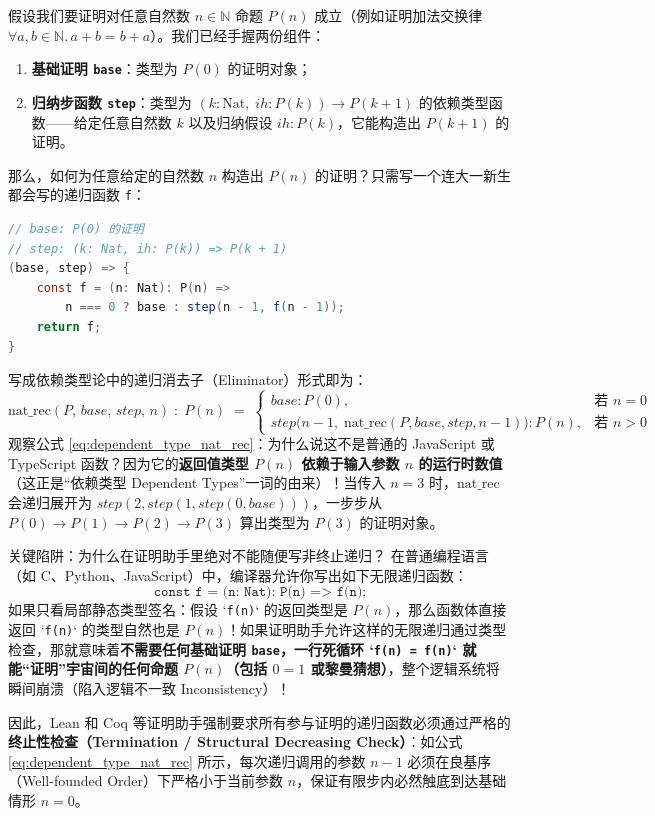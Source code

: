 \documentclass[a4paper]{article}
\begin{document}
假设我们要证明对任意自然数 $n \in \mathbb{N}$ 命题 $P(n)$ 成立（例如证明加法交换律 $\forall a, b \in \mathbb{N}.\, a + b = b + a$）。我们已经手握两份组件：
\begin{enumerate}
    \item \textbf{基础证明 \texttt{base}}：类型为 $P(0)$ 的证明对象；
    \item \textbf{归纳步函数 \texttt{step}}：类型为 $(k: \mathrm{Nat},\; \mathit{ih}: P(k)) \to P(k+1)$ 的依赖类型函数——给定任意自然数 $k$ 以及归纳假设 $\mathit{ih}: P(k)$，它能构造出 $P(k+1)$ 的证明。
\end{enumerate}
那么，如何为任意给定的自然数 $n$ 构造出 $P(n)$ 的证明？只需写一个连大一新生都会写的递归函数 \texttt{f}：
\begin{lstlisting}[language=Java, caption={自然数数学归纳法的依赖类型递归程序表示}]
// base: P(0) 的证明
// step: (k: Nat, ih: P(k)) => P(k + 1)
(base, step) => {
    const f = (n: Nat): P(n) =>
        n === 0 ? base : step(n - 1, f(n - 1));
    return f;
}
\end{lstlisting}
写成依赖类型论中的递归消去子（Eliminator）形式即为：
\begin{equation}
\mathrm{nat\_rec}(P,\, \mathit{base},\, \mathit{step},\, n) \;:\; P(n) \;=\;
\begin{cases}
\mathit{base} : P(0), & \text{若 } n = 0 \\[4pt]
\mathit{step}\big(n - 1,\; \mathrm{nat\_rec}(P, \mathit{base}, \mathit{step}, n - 1)\big) : P(n), & \text{若 } n > 0
\end{cases}
\label{eq:dependent_type_nat_rec}
\end{equation}
观察公式 \eqref{eq:dependent_type_nat_rec}：为什么说这不是普通的 JavaScript 或 TypeScript 函数？因为它的\textbf{返回值类型 $P(n)$ 依赖于输入参数 $n$ 的运行时数值}（这正是“依赖类型 Dependent Types”一词的由来）！当传入 $n = 3$ 时，$\mathrm{nat\_rec}$ 会递归展开为 $\mathit{step}(2, \mathit{step}(1, \mathit{step}(0, \mathit{base})))$，一步步从 $P(0) \to P(1) \to P(2) \to P(3)$ 算出类型为 $P(3)$ 的证明对象。

\begin{warningbox}{关键陷阱：为什么在证明助手里绝对不能随便写非终止递归？}
在普通编程语言（如 C、Python、JavaScript）中，编译器允许你写出如下无限递归函数：
\[
\texttt{const f = (n: Nat): P(n) => f(n);}
\]
如果只看局部静态类型签名：假设 `\texttt{f(n)}` 的返回类型是 $P(n)$，那么函数体直接返回 `\texttt{f(n)}` 的类型自然也是 $P(n)$！如果证明助手允许这样的无限递归通过类型检查，那就意味着\textbf{不需要任何基础证明 \texttt{base}，一行死循环 `\texttt{f(n) = f(n)}` 就能“证明”宇宙间的任何命题 $P(n)$（包括 $0 = 1$ 或黎曼猜想）}，整个逻辑系统将瞬间崩溃（陷入逻辑不一致 Inconsistency）！

因此，Lean 和 Coq 等证明助手强制要求所有参与证明的递归函数必须通过严格的\textbf{终止性检查（Termination / Structural Decreasing Check）}：如公式 \eqref{eq:dependent_type_nat_rec} 所示，每次递归调用的参数 $n - 1$ 必须在良基序（Well-founded Order）下严格小于当前参数 $n$，保证有限步内必然触底到达基础情形 $n = 0$。
\end{warningbox}
\end{document}

